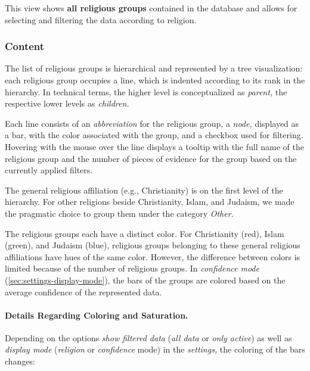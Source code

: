 This view shows \textbf{all religious groups} contained in the database and allows for selecting and filtering the data according to religion.


\subsubsection{Content}
The list of religious groups is hierarchical and represented by a tree visualization:
each religious group occupies a line, which is indented according to its rank in the hierarchy.
In technical terms, the higher level is conceptualized as \emph{parent,} the respective lower levels as \emph{children.}

Each line consists of an \emph{abbreviation} for the religious group, a \emph{node,} displayed as a bar, with the color associated with the group, and a checkbox used for filtering.
Hovering with the mouse over the line displays a tooltip with the full name of the religious group and the number of pieces of evidence for the group based on the currently applied filters.

The general religious affiliation (e.g., Christianity) is on the first level of the hierarchy.
For other religions beside Christianity, Islam, and Judaism, we made the pragmatic choice to group them under the category \emph{Other.}

The religious groups each have a distinct color.
For Christianity (red), Islam (green), and Judaism (blue), religious groups belonging to these general religious affiliations have hues of the same color.
However, the difference between colors is limited because of the number of religious groups.
In \emph{confidence mode} (\cref{sec:settings-display-mode}), the bars of the groups are colored based on the average confidence of the represented data.

\paragraph{Details Regarding Coloring and Saturation.}
Depending on the options \emph{show filtered data} (\emph{all data} or \emph{only active}) as well as \emph{display mode} (\emph{religion} or \emph{confidence} mode) in the \emph{settings,} the coloring of the bars changes:

